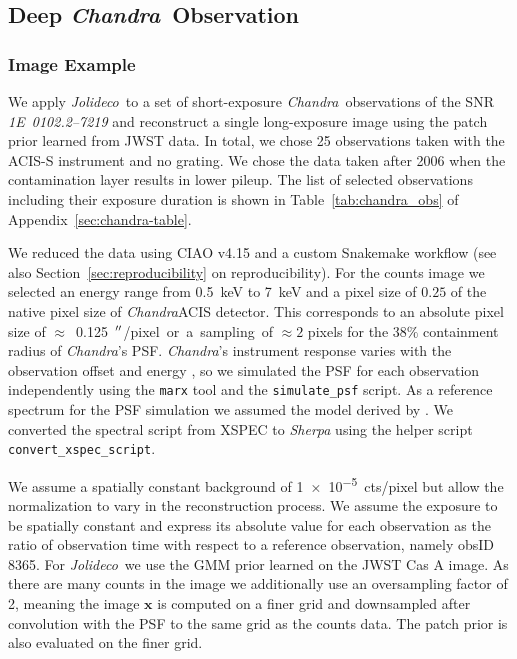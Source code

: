 \documentclass[twocolumn, linenumbers]{aastex631}
\newcommand{\chandra}{\textit{Chandra}~}
\newcommand{\chandranospace}{\textit{Chandra}}
\newcommand{\jolideco}{\textit{Jolideco}~}
\begin{document}
    \subsection{Deep \chandra Observation}
    \label{sec:chandra-example}
    \subsubsection{Image Example}
    We apply \jolideco to a set of short-exposure \chandra observations of the SNR \textit{1E~0102.2–7219} and reconstruct a single long-exposure image using the patch prior learned from JWST data. In total, we chose 25 observations taken with  the ACIS-S instrument and no grating. We chose the data taken after 2006 when the contamination layer results in lower pileup. The list of selected observations including their exposure duration is shown in Table~\ref{tab:chandra_obs} of Appendix~\ref{sec:chandra-table}.

    We reduced the data using CIAO v4.15 \citep{Fruscione2006} and a custom Snakemake workflow (see also Section~\ref{sec:reproducibility} on reproducibility). For the counts image we selected an energy range from \qty[mode = text]{0.5}{keV} to  \qty[mode = text]{7}{keV} and a pixel size of $0.25$ of the native pixel size of \chandranospace ACIS detector. This corresponds to an absolute  pixel size of $\approx$~\qty[mode = text]{0.125}{$\mbox{$^{\prime\prime}$}$/pixel} or a sampling of $\approx2$ pixels for the $38\%$ containment radius of \chandranospace's PSF. \chandranospace's instrument response varies with the observation offset and energy \citep{ChandraPOG2022}, so we simulated the PSF for each observation independently using the \texttt{marx} tool \citep{Davis2012} and the \texttt{simulate\_psf} script. As a reference spectrum for the PSF simulation we assumed the model derived by \cite{Plucinsky2017}. We converted the spectral script from XSPEC to {\it Sherpa} using the helper script \texttt{convert\_xspec\_script}.

    We assume a spatially constant background of \qty[mode = text]{1e-5}{cts/pixel} but allow the normalization to vary in the reconstruction process. We assume the exposure to be spatially constant and express its absolute value for each observation as the ratio of observation time with respect to a reference observation, namely obsID 8365. For \jolideco we use the GMM prior learned on the JWST Cas A image. As there are many counts in the image we additionally use an oversampling factor of 2, meaning the image $\mathbf{x}$ is computed on a finer grid and downsampled after convolution with the PSF to the same grid as the counts data. The patch prior is also evaluated on the finer grid.
    
\end{document}
